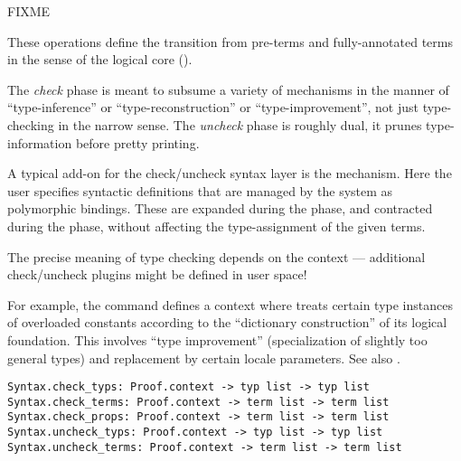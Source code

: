 \begin{isabellebody}
\begin{isamarkuptext}
  \begin{description}

  \item FIXME

  \end{description}%
\end{isamarkuptext}%
\isamarkuptrue%
%
\endisatagmlref
{\isafoldmlref}%
%
\isadelimmlref
%
\endisadelimmlref
%
\isamarkuptrue%
%
\begin{isamarkuptext}%
These operations define the transition from pre-terms and
  fully-annotated terms in the sense of the logical core
  ().

  The \emph{check} phase is meant to subsume a variety of mechanisms
  in the manner of ``type-inference'' or ``type-reconstruction'' or
  ``type-improvement'', not just type-checking in the narrow sense.
  The \emph{uncheck} phase is roughly dual, it prunes type-information
  before pretty printing.

  A typical add-on for the check/uncheck syntax layer is the \hyperlink{command.abbreviation}{\mbox{}} mechanism.  Here the user specifies syntactic
  definitions that are managed by the system as polymorphic  bindings.  These are expanded during the 
  phase, and contracted during the  phase, without
  affecting the type-assignment of the given terms.

  \medskip The precise meaning of type checking depends on the context
  --- additional check/uncheck plugins might be defined in user space!

  For example, the \hyperlink{command.class}{\mbox{}} command defines a context where
   treats certain type instances of overloaded
  constants according to the ``dictionary construction'' of its
  logical foundation.  This involves ``type improvement''
  (specialization of slightly too general types) and replacement by
  certain locale parameters.  See also \cite{Haftmann-Wenzel:2009}.%
\end{isamarkuptext}%
\isamarkuptrue%
%
\isadelimmlref
%
\endisadelimmlref
%
\isatagmlref
%
\begin{isamarkuptext}%
\begin{mldecls}
  \verb|Syntax.check_typs: Proof.context -> typ list -> typ list| \\
  \verb|Syntax.check_terms: Proof.context -> term list -> term list| \\
  \verb|Syntax.check_props: Proof.context -> term list -> term list| \\
  \verb|Syntax.uncheck_typs: Proof.context -> typ list -> typ list| \\
  \verb|Syntax.uncheck_terms: Proof.context -> term list -> term list| \\
  \end{mldecls}


\end{isamarkuptext}
\end{isabellebody}
